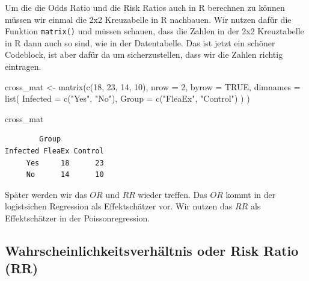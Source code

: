 \documentclass[
  letterpaper,
]{scrbook}
\newenvironment{Shaded}{\begin{snugshade}}{\end{snugshade}}
\newcommand{\AttributeTok}[1]{\textcolor[rgb]{0.40,0.45,0.13}{#1}}
\newcommand{\ConstantTok}[1]{\textcolor[rgb]{0.56,0.35,0.01}{#1}}
\newcommand{\DecValTok}[1]{\textcolor[rgb]{0.68,0.00,0.00}{#1}}
\newcommand{\FunctionTok}[1]{\textcolor[rgb]{0.28,0.35,0.67}{#1}}
\newcommand{\NormalTok}[1]{\textcolor[rgb]{0.00,0.23,0.31}{#1}}
\newcommand{\OtherTok}[1]{\textcolor[rgb]{0.00,0.23,0.31}{#1}}
\newcommand{\StringTok}[1]{\textcolor[rgb]{0.13,0.47,0.30}{#1}}
\begin{document}
Um die die Odds Ratio und die Risk Ratios auch in R berechnen zu können
müssen wir einmal die 2x2 Kreuzabelle in R nachbauen. Wir nutzen dafür
die Funktion \texttt{matrix()} und müssen schauen, dass die Zahlen in
der 2x2 Kreuztabelle in R dann auch so sind, wie in der Datentabelle.
Das ist jetzt ein schöner Codeblock, ist aber dafür da um
sicherzustellen, dass wir die Zahlen richtig eintragen.

\begin{Shaded}
\begin{Highlighting}[]
\NormalTok{cross\_mat }\OtherTok{\textless{}{-}} \FunctionTok{matrix}\NormalTok{(}\FunctionTok{c}\NormalTok{(}\DecValTok{18}\NormalTok{, }\DecValTok{23}\NormalTok{, }\DecValTok{14}\NormalTok{, }\DecValTok{10}\NormalTok{),}
  \AttributeTok{nrow =} \DecValTok{2}\NormalTok{, }\AttributeTok{byrow =} \ConstantTok{TRUE}\NormalTok{,}
  \AttributeTok{dimnames =} \FunctionTok{list}\NormalTok{(}
    \AttributeTok{Infected =} \FunctionTok{c}\NormalTok{(}\StringTok{"Yes"}\NormalTok{, }\StringTok{"No"}\NormalTok{),}
    \AttributeTok{Group =} \FunctionTok{c}\NormalTok{(}\StringTok{"FleaEx"}\NormalTok{, }\StringTok{"Control"}\NormalTok{)}
\NormalTok{  )}
\NormalTok{)}

\NormalTok{cross\_mat}
\end{Highlighting}
\end{Shaded}

\begin{verbatim}
        Group
Infected FleaEx Control
     Yes     18      23
     No      14      10
\end{verbatim}


Später werden wir das \(OR\) und \(RR\) wieder treffen. Das \(OR\) kommt
in der logistsichen Regression als Effektschätzer vor. Wir nutzen das
\(RR\) als Effektschätzer in der Poissonregression.

\hypertarget{wahrscheinlichkeitsverhuxe4ltnis-oder-risk-ratio-rr}{%
\subsection{Wahrscheinlichkeitsverhältnis oder Risk Ratio
(RR)}\label{wahrscheinlichkeitsverhuxe4ltnis-oder-risk-ratio-rr}}
\end{document}
